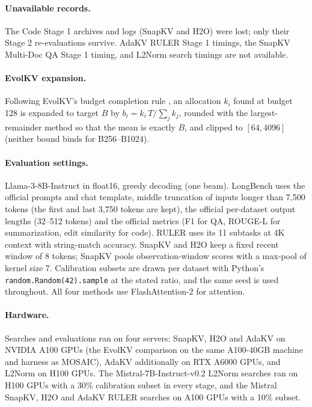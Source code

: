 \paragraph{Unavailable records.} The Code Stage 1 archives and logs (SnapKV and H2O) were lost; only their Stage 2 re-evaluations survive. AdaKV RULER Stage 1 timings, the SnapKV Multi-Doc QA Stage 1 timing, and L2Norm search timings are not available.

\paragraph{EvolKV expansion.} Following EvolKV's budget completion rule \citep{yu2025evolkv}, an allocation $k_i$ found at budget 128 is expanded to target $B$ by $b_i = k_i\,T / \sum_j k_j$, rounded with the largest-remainder method so that the mean is exactly $B$, and clipped to $[64, 4096]$ (neither bound binds for B256--B1024).

\paragraph{Evaluation settings.} Llama-3-8B-Instruct in float16, greedy decoding (one beam). LongBench uses the official prompts and chat template, middle truncation of inputs longer than 7{,}500 tokens (the first and last 3{,}750 tokens are kept), the official per-dataset output lengths (32--512 tokens) and the official metrics (F1 for QA, ROUGE-L for summarization, edit similarity for code). RULER uses its 11 subtasks at 4K context with string-match accuracy. SnapKV and H2O keep a fixed recent window of 8 tokens; SnapKV pools observation-window scores with a max-pool of kernel size 7. Calibration subsets are drawn per dataset with Python's \texttt{random.Random(42).sample} at the stated ratio, and the same seed is used throughout. All four methods use FlashAttention-2 for attention.

\paragraph{Hardware.} Searches and evaluations ran on four servers: SnapKV, H2O and AdaKV on NVIDIA A100 GPUs (the EvolKV comparison on the same A100-40GB machine and harness as MOSAIC), AdaKV additionally on RTX A6000 GPUs, and L2Norm on H100 GPUs. The Mistral-7B-Instruct-v0.2 L2Norm searches ran on H100 GPUs with a 30\% calibration subset in every stage, and the Mistral SnapKV, H2O and AdaKV RULER searches on A100 GPUs with a 10\% subset.
